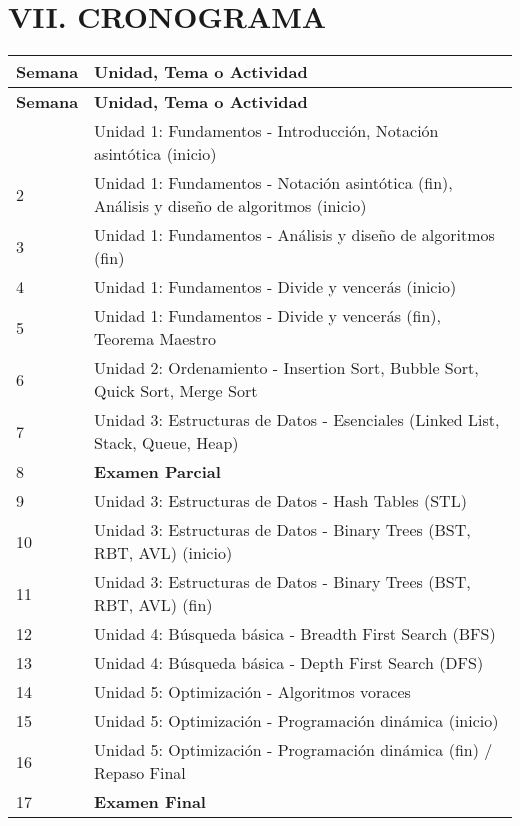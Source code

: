 \documentclass[12pt,a4paper]{article}
\begin{document}
\section*{VII. CRONOGRAMA} %
\begin{longtable}{p{2cm} p{12cm}}
    \toprule
    \textbf{Semana} & \textbf{Unidad, Tema o Actividad} \\ %
    \midrule
    \endfirsthead
    \toprule
    \textbf{Semana} & \textbf{Unidad, Tema o Actividad} \\
    \midrule
    \endhead
    \bottomrule
    \endfoot
    1 & Unidad 1: Fundamentos - Introducción, Notación asintótica (inicio) \\ %
    2 & Unidad 1: Fundamentos - Notación asintótica (fin), Análisis y diseño de algoritmos (inicio) \\ %
    3 & Unidad 1: Fundamentos - Análisis y diseño de algoritmos (fin) \\ %
    4 & Unidad 1: Fundamentos - Divide y vencerás (inicio) \\ %
    5 & Unidad 1: Fundamentos - Divide y vencerás (fin), Teorema Maestro \\ %
    6 & Unidad 2: Ordenamiento - Insertion Sort, Bubble Sort, Quick Sort, Merge Sort \\ %
    7 & Unidad 3: Estructuras de Datos - Esenciales (Linked List, Stack, Queue, Heap) \\ %
    8 & \textbf{Examen Parcial} \\ %
    9 & Unidad 3: Estructuras de Datos - Hash Tables (STL) \\ %
    10 & Unidad 3: Estructuras de Datos - Binary Trees (BST, RBT, AVL) (inicio) \\ %
    11 & Unidad 3: Estructuras de Datos - Binary Trees (BST, RBT, AVL) (fin) \\ %
    12 & Unidad 4: Búsqueda básica - Breadth First Search (BFS) \\ %
    13 & Unidad 4: Búsqueda básica - Depth First Search (DFS) \\ %
    14 & Unidad 5: Optimización - Algoritmos voraces \\ %
    15 & Unidad 5: Optimización - Programación dinámica (inicio) \\ %
    16 & Unidad 5: Optimización - Programación dinámica (fin) / Repaso Final \\ %
    17 & \textbf{Examen Final} \\ %
\end{longtable}
\vspace{0.5cm}
\end{document}
